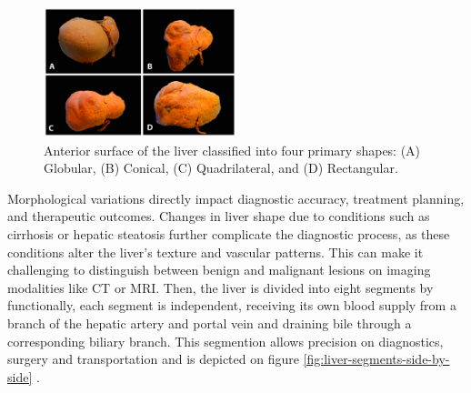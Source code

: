 \documentclass[11pt]{article} %
\begin{document}
\begin{multicols}{2}
\begin{figure}[H]
	\centering
	\includegraphics[width=0.5\textwidth]{assets/diagnostics-13-02371-g001.png} %
	\caption{Anterior surface of the liver classified into four primary shapes: (A) Globular, (B) Conical, (C) Quadrilateral, and (D) Rectangular.}
	\label{fig:liver-shapes}
\end{figure}

Morphological variations directly impact diagnostic accuracy, treatment planning, and therapeutic outcomes. Changes in liver shape due to conditions such as cirrhosis or hepatic steatosis further complicate the diagnostic process, as these conditions alter the liver’s texture and vascular patterns. This can make it challenging to distinguish between benign and malignant lesions on imaging modalities like CT or MRI. Then, the liver is divided into eight segments by functionally, each segment is independent, receiving its own blood supply from a branch of the hepatic artery and portal vein and draining bile through a corresponding biliary branch. This segmention allows precision on diagnostics, surgery and transportation and is depicted on figure \ref{fig:liver-segments-side-by-side} \cite{diagnostics13142371}.


\end{multicols}
\end{document}

